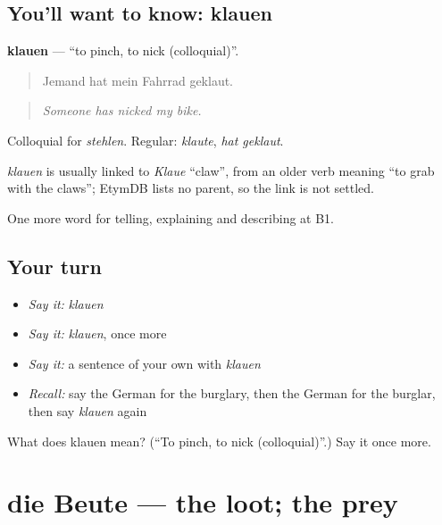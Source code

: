 \subsection*{You'll want to know: klauen}
\textbf{klauen} — \textquotedblleft{}to pinch, to nick (colloquial)\textquotedblright{}.

\begin{quote}
Jemand hat mein Fahrrad geklaut.
\end{quote}

\begin{quote}
\emph{Someone has nicked my bike.}
\end{quote}

Colloquial for \emph{stehlen}. Regular: \emph{klaute}, \emph{hat geklaut}.

\begin{cousinweb}
\emph{klauen} is usually linked to \emph{Klaue} \textquotedblleft{}claw\textquotedblright{}, from an older verb meaning \textquotedblleft{}to grab with the claws\textquotedblright{}; EtymDB lists no parent, so the link is not settled.
\end{cousinweb}

\begin{grammarlens}[title={What you've built}]
One more word for telling, explaining and describing at B1.
\end{grammarlens}

\subsection*{Your turn}
\begin{itemize}
\raggedright
  \item \emph{Say it:} \emph{klauen}
  \item \emph{Say it:} \emph{klauen}, once more
  \item \emph{Say it:} a sentence of your own with \emph{klauen}
  \item \emph{Recall:} say the German for the burglary, then the German for the burglar, then say \emph{klauen} again
\end{itemize}

\begin{tcolorbox}[breakable,colback=teal!4,colframe=teal!35!black,title={Before you move on}]
What does klauen mean? (\textquotedblleft{}To pinch, to nick (colloquial)\textquotedblright{}.) Say it once more.
\end{tcolorbox}
\section[die Beute]{die Beute — the loot; the prey}

